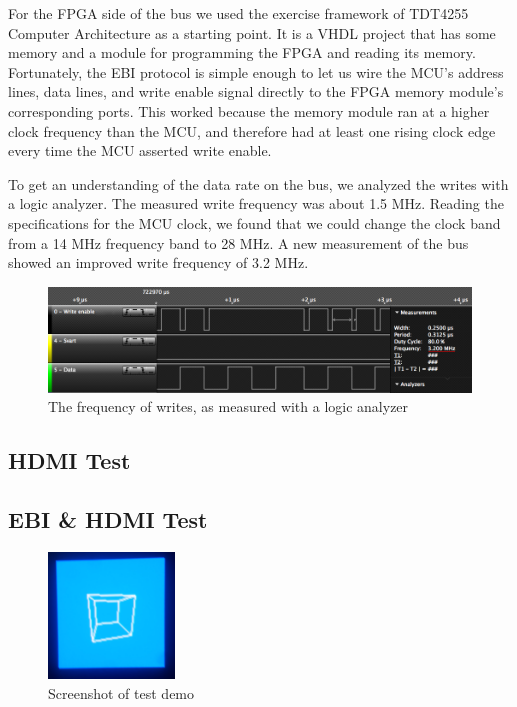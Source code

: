 For the FPGA side of the bus we used the exercise framework of TDT4255 Computer Architecture as a starting point.
It is a VHDL project that has some memory and a module for programming the FPGA and reading its memory.
Fortunately, the EBI protocol is simple enough to let us wire the MCU's address lines, data lines, and write enable signal directly to the FPGA memory module's corresponding ports.
This worked because the memory module ran at a higher clock frequency than the MCU, and therefore had at least one rising clock edge every time the MCU asserted write enable.

To get an understanding of the data rate on the bus, we analyzed the writes with a logic analyzer.
The measured write frequency was about 1.5 MHz.
Reading the specifications for the MCU clock, we found that we could change the clock band from a 14 MHz frequency band to 28 MHz.
A new measurement of the bus showed an improved write frequency of 3.2 MHz.

\begin{figure}[htp]
\centering
\includegraphics[width=\textwidth]{diagrams/ebi_bus_write_speed.png}
\caption{The frequency of writes, as measured with a logic analyzer}
\label{ebi_bis_write_speed}
\end{figure}

\subsection{HDMI Test}

\subsection{EBI \& HDMI Test}

\begin{figure}
\centering
\includegraphics[width=0.3\textwidth]{diagrams/prototype_demo.png}
\caption{Screenshot of test demo}
\label{prototype_demo}
\end{figure}

